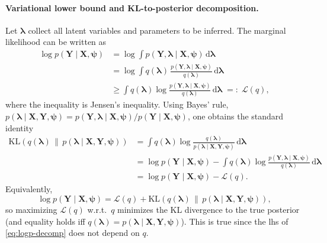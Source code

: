 \paragraph{Variational lower bound and KL-to-posterior decomposition.}
Let \(\boldsymbol{\lambda}\) collect all latent variables and parameters to be inferred. The marginal likelihood can be written as
\begin{align}
\log p(\mathbf{Y}\mid \mathbf{X},\boldsymbol{\psi})
&= \log \int p(\mathbf{Y},\boldsymbol{\lambda}\mid \mathbf{X},\boldsymbol{\psi})\,\mathrm{d}\boldsymbol{\lambda}
\nonumber\\
&= \log \int q(\boldsymbol{\lambda})\,
\frac{p(\mathbf{Y},\boldsymbol{\lambda}\mid \mathbf{X},\boldsymbol{\psi})}{q(\boldsymbol{\lambda})}\,
\mathrm{d}\boldsymbol{\lambda}
\nonumber\\
&\ge \int q(\boldsymbol{\lambda})
\log\frac{p(\mathbf{Y},\boldsymbol{\lambda}\mid \mathbf{X},\boldsymbol{\psi})}{q(\boldsymbol{\lambda})}\,
\mathrm{d}\boldsymbol{\lambda}
\;=:\; \mathcal{L}(q),
\label{eq:elbo-def}
\end{align}
where the inequality is Jensen's inequality.
Using Bayes' rule,
\(
p(\boldsymbol{\lambda}\mid \mathbf{X},\mathbf{Y},\boldsymbol{\psi})
=
p(\mathbf{Y},\boldsymbol{\lambda}\mid \mathbf{X},\boldsymbol{\psi})/p(\mathbf{Y}\mid \mathbf{X},\boldsymbol{\psi})
\),
one obtains the standard identity
\begin{align}
\mathrm{KL}\!\left(q(\boldsymbol{\lambda})\,\|\,p(\boldsymbol{\lambda}\mid \mathbf{X},\mathbf{Y},\boldsymbol{\psi})\right)
&=
\int q(\boldsymbol{\lambda})
\log\frac{q(\boldsymbol{\lambda})}{p(\boldsymbol{\lambda}\mid \mathbf{X},\mathbf{Y},\boldsymbol{\psi})}\,
\mathrm{d}\boldsymbol{\lambda}
\nonumber\\
&=
\log p(\mathbf{Y}\mid \mathbf{X},\boldsymbol{\psi})
-\int q(\boldsymbol{\lambda})
\log\frac{p(\mathbf{Y},\boldsymbol{\lambda}\mid \mathbf{X},\boldsymbol{\psi})}{q(\boldsymbol{\lambda})}\,
\mathrm{d}\boldsymbol{\lambda}
\nonumber\\
&= \log p(\mathbf{Y}\mid \mathbf{X},\boldsymbol{\psi}) - \mathcal{L}(q).
\label{eq:logp-elbo-kl}
\end{align}
Equivalently,
\begin{equation}
\log p(\mathbf{Y}\mid \mathbf{X},\boldsymbol{\psi})
=
\mathcal{L}(q)
+
\mathrm{KL}\!\left(q(\boldsymbol{\lambda})\,\|\,p(\boldsymbol{\lambda}\mid \mathbf{X},\mathbf{Y},\boldsymbol{\psi})\right),
\label{eq:logp-decomp}
\end{equation}
so maximizing \(\mathcal{L}(q)\) w.r.t.\ \(q\) minimizes the KL divergence to the true posterior (and equality holds iff \(q(\boldsymbol{\lambda}) = p(\boldsymbol{\lambda}\mid \mathbf{X},\mathbf{Y},\boldsymbol{\psi})\)). 
This is true since the lhs of \eqref{eq:logp-decomp} does not depend on \(q\).


